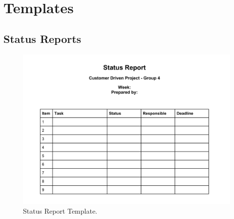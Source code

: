  

\chapter{Templates}

\section{Status Reports}
\begin{figure}[htbp]
\begin{center}
\includegraphics[width = \textwidth]{Appendix/statusreportTemp.jpg}
\caption{Status Report Template.}
\label{StatusReportTemplate}
\end{center}
\end{figure}

